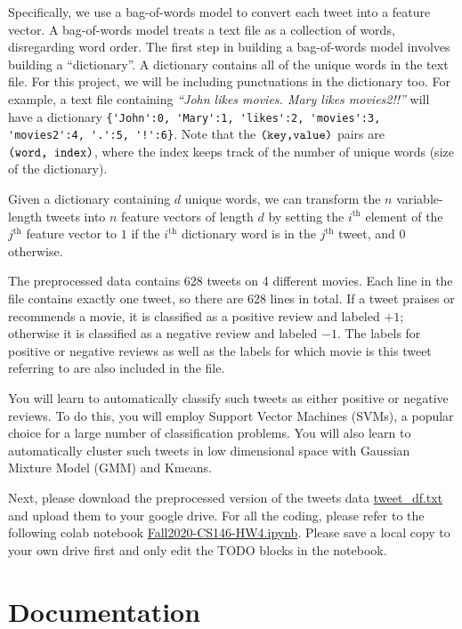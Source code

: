\documentclass[11pt]{article}
\begin{document}
Specifically, we use a bag-of-words model to convert each tweet into a feature vector. A bag-of-words model treats a text file as a collection of words, disregarding word order. The first step in building a bag-of-words model involves building a ``dictionary''. A dictionary contains all of the unique words in the text file. For this project, we will be including punctuations in the dictionary too. For example, a text file containing \textit{``John likes movies. Mary likes movies2!!''} will have a dictionary \verb|{'John':0, 'Mary':1, 'likes':2, 'movies':3, 'movies2':4, '.':5, '!':6}|. Note that the $\verb|(key,value)|$ pairs are $\verb|(word, index)|$, where the index keeps track of the number of unique words (size of the dictionary).

Given a dictionary containing $d$ unique words, we can transform the $n$ variable-length tweets into $n$ feature vectors of length $d$ by setting the $i^\textrm{th}$ element of the $j^\textrm{th}$ feature vector to $1$ if the $i^\textrm{th}$ dictionary word is in the $j^\textrm{th}$ tweet, and $0$ otherwise.

The preprocessed data contains 628 tweets on 4 different movies. Each line in the file contains exactly one tweet, so there are 628 lines in total. 
If a tweet praises or recommends a movie, it is classified as a positive review and labeled $+1$; otherwise it is classified as a negative review and labeled $-1$. The labels for positive or negative reviews as well as the labels for which movie is this tweet referring to are also included in the file. 

You will learn to automatically classify such tweets as either positive or negative reviews. To do this, you will employ Support Vector Machines (SVMs), a popular choice for a large number of classification problems. You will also learn to automatically cluster such tweets in low dimensional space with Gaussian Mixture Model (GMM) and Kmeans. 

Next, please download the preprocessed version of the tweets data \href{https://drive.google.com/file/d/1peuPuSMEmy9DT2hpAYBWj1srur_OkcVq/view?usp=sharing}{tweet\_df.txt} and upload them to your google drive. For all the coding, please refer to the following colab notebook  
\href{https://colab.research.google.com/drive/1HAefzTFUIupG5_o8fzv3oKGfHZLCjVAx?usp=sharing}{Fall2020-CS146-HW4.ipynb}. Please save a local copy to your own drive first and only edit the TODO blocks in the notebook.

\section*{Documentation}
\end{document}
